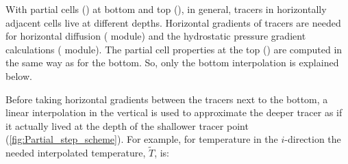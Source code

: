 \documentclass[../main/NEMO_manual]{subfiles}
\begin{document}
With partial cells () at bottom and top (),
in general, tracers in horizontally adjacent cells live at different depths.
Horizontal gradients of tracers are needed for horizontal diffusion ( module) and
the hydrostatic pressure gradient calculations ( module).
The partial cell properties at the top () are computed in the same way as
for the bottom.
So, only the bottom interpolation is explained below.

Before taking horizontal gradients between the tracers next to the bottom,
a linear interpolation in the vertical is used to approximate the deeper tracer as if
it actually lived at the depth of the shallower tracer point (\autoref{fig:Partial_step_scheme}).
For example, for temperature in the $i$-direction the needed interpolated temperature, $\widetilde{T}$, is:
\end{document}
